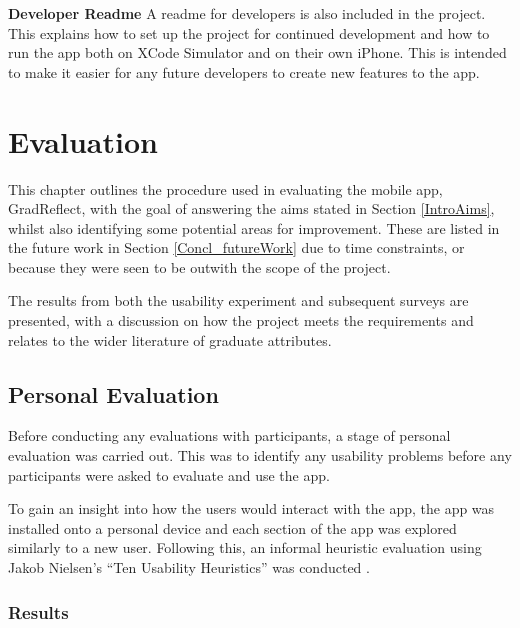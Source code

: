 \documentclass{l4proj}
\begin{document}
\textbf{Developer Readme} A readme for developers is also included in the project. This explains how to set up the project for continued development and how to run the app both on XCode Simulator and on their own iPhone. This is intended to make it easier for any future developers to create new features to the app. 

\chapter{Evaluation} \label{evaluation}

This chapter outlines the procedure used in evaluating the mobile app, GradReflect, with the goal of answering the aims stated in Section \ref{IntroAims}, whilst also identifying some potential areas for improvement. These are listed in the future work in Section \ref{Concl_futureWork} due to time constraints, or because they were seen to be outwith the scope of the project. 

The results from both the usability experiment and subsequent surveys are presented, with a discussion on how the project meets the requirements and relates to the wider literature of graduate attributes.

\section{Personal Evaluation}

Before conducting any evaluations with participants, a stage of personal evaluation was carried out. This was to identify any usability problems before any participants were asked to evaluate and use the app. 
 
To gain an insight into how the users would interact with the app, the app was installed onto a personal device and each section of the app was explored similarly to a new user. Following this, an informal heuristic evaluation using Jakob Nielsen’s “Ten Usability Heuristics” was conducted \citep{Nielsen10}. 

\subsection{Results}
\end{document}
